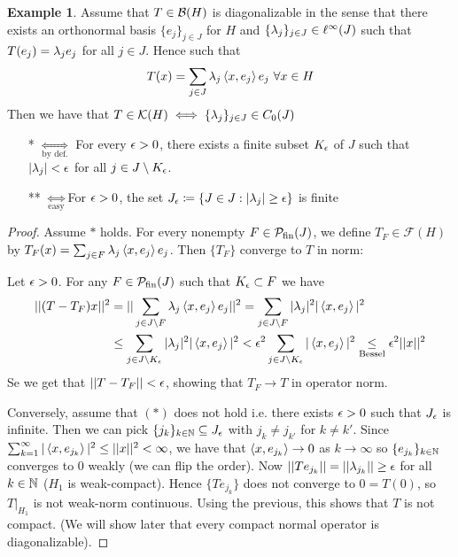 \documentclass[10pt,english,a4paper]{article}
\theoremstyle{definition}
\newtheorem*{example}{Example}
\def\Psfin{\mathcal{P}_{\textnormal{fin}}}
\def\Ff{\mathcal{F}}
\def\Kf{\mathcal{K}}
\begin{document}
\begin{example}
    Assume that $T \in \mathcal{B}(H)$ is diagonalizable in the sense that there exists 
an orthonormal basis $\{e_j\}_{j \in J}$ for $H$ and $\{\lambda_j\}_{j\in J} \in
\ell^{\infty}(J)$ such that $T(e_j) = \lambda_je_j$ for all $j\in J$. Hence such that 
\[ T(x) = \sum_{j \in J} \lambda_{j}\left\langle x, e_j \right\rangle e_j ~\forall x \in H \]
Then we have that $T \in \Kf(H)\iff \{\la_j\}_{j\in J} \in C_{0}(J)$ 
\begin{itemize}
    \item[*] $\underset{\text{by def.}}{\iff}$ For every $\epsilon >0$, there exists
    a finite subset $K_{\epsilon}$ of $J$ such that $|\lambda_j|<\epsilon$ for all $j\in
    J\setminus K_{\epsilon}$.

    \item[**] $\underset{\text{easy}}{\iff}$For $\epsilon >0$, the set $J_{\epsilon}\coloneqq \{ J \in J : |\lambda_j| \geq \epsilon\}$
    is finite
\end{itemize}
\begin{proof}
   Assume $*$ holds. For every nonempty $F \in \Psfin(J)$, we define $T_F \in \Ff(H)$
by $T_{F}(x) = \sum_{j \in F}\lambda_j\left\langle x,e_j \right\rangle e_j$. Then $\{T_F\}$ converge to 
$T$ in norm: 

Let $\epsilon>0$. For any $F \in \Psfin(J)$
such that $K_{\epsilon} \subset F$ we have 
\begin{align*}
||(T-T_F)x||^2 &= ||\sum_{j\in J\setminus F}\lambda_j\left\langle x,e_j \right\rangle e_j||^2 
= \sum_{j\in J\setminus F} |\lambda_j|^2 |\left\langle x,e_j \right\rangle|^2 \\
&\leq \sum_{j\in J\setminus K_{\epsilon}} |\lambda_j|^2 |\left\langle x,e_j \right\rangle|^2 
< \epsilon^2 \sum_{j \in J\setminus K_{\epsilon}}|\left\langle x,e_j \right\rangle|^2 \underset{\text{Bessel}}{\leq}\epsilon^2 ||x||^2
\end{align*}
Se we get that $||T-T_F|| < \epsilon$, showing that $T_F \to T$ in operator norm. 

Conversely, assume that $(*)$ does not hold i.e. there exists $\epsilon>0$ such that 
$J_{\epsilon}$ is infinite. Then we can pick $\{j_k\}_{k\in \mathbb{N}} \subseteq J_{\epsilon}$
with $j_k \neq j_{k'}$ for $k\neq k'$. Since $\sum_{k=1}^{\infty}
|\left\langle x,e_{j_k} \right\rangle|^2 \leq ||x||^2 <\infty$, we have that $\left\langle x,e_{j_k} \right\rangle \to 0$
as $k\to \infty$ so $\{e_{j_k}\}_{k\in \mathbb{N}}$ converges to 0 weakly (we can flip the order). 
Now $||Te_{j_k}|| = ||\lambda_{j_k}|| \geq \epsilon$ for all $k \in \mathbb{N}$ ($H_1$ is weak-compact). Hence $\{Te_{j_k}\}$
does not converge to $0 = T(0)$, so $T\lvert_{H_1}$ is not weak-norm continuous. 
Using the previous, this shows that $T$ is not compact. (We will show later that 
every compact normal operator is diagonalizable).
\end{proof}
\end{example}
\end{document}
